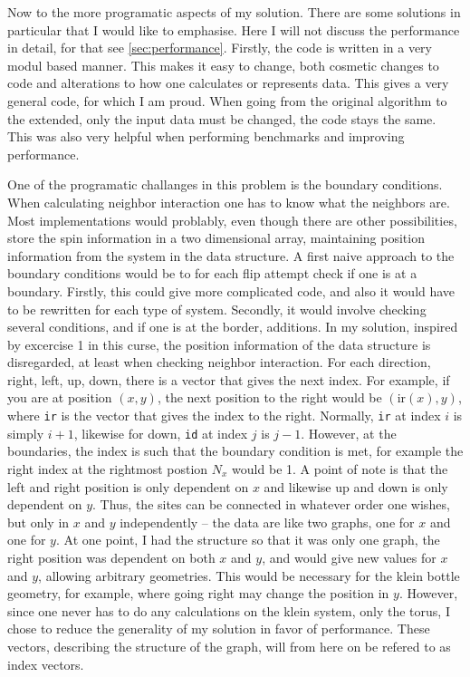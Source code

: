 \documentclass[12pt, a4paper]{article}
\begin{document}
Now to the more programatic aspects of my solution.
There are some solutions in particular that I would like to emphasise.
Here I will not discuss the performance in detail, for that see \ref{sec:performance}.
Firstly, the code is written in a very modul based manner.
This makes it easy to change, both cosmetic changes to code and alterations to how one calculates or represents data.
This gives a very general code, for which I am proud.
When going from the original algorithm to the extended, only the input data must be changed, the code stays the same.
This was also very helpful when performing benchmarks and improving performance.

One of the programatic challanges in this problem is the boundary conditions.
When calculating neighbor interaction one has to know what the neighbors are.
Most implementations would problably, even though there are other possibilities, store the spin information in a two dimensional array, maintaining position information from the system in the data structure.
A first naive approach to the boundary conditions would be to for each flip attempt check if one is at a boundary.
Firstly, this could give more complicated code, and also it would have to be rewritten for each type of system.
Secondly, it would involve checking several conditions, and if one is at the border, additions.
In my solution, inspired by excercise 1 in this curse, the position information of the data structure is disregarded, at least when checking neighbor interaction.
For each direction, right, left, up, down, there is a vector that gives the next index.
For example, if you are at position $(x, y)$, the next position to the right would be $(\text{ir}(x), y)$, where \verb|ir| is the vector that gives the index to the right.
Normally, \verb|ir| at index $i$ is simply $i+1$, likewise for down, \verb|id| at index $j$ is $j-1$.
However, at the boundaries, the index is such that the boundary condition is met, for example the right index at the rightmost postion $N_x$ would be 1.
A point of note is that the left and right position is only dependent on $x$ and likewise up and down is only dependent on $y$.
Thus, the sites can be connected in whatever order one wishes, but only in $x$ and $y$ independently -- the data are like two graphs, one for $x$ and one for $y$.
At one point, I had the structure so that it was only one graph, the right position was dependent on both $x$ and $y$, and would give new values for $x$ and $y$, allowing arbitrary geometries.
This would be necessary for the klein bottle geometry, for example, where going right may change the position in $y$.
However, since one never has to do any calculations on the klein system, only the torus, I chose to reduce the generality of my solution in favor of performance.
These vectors, describing the structure of the graph, will from here on be refered to as index vectors.
\end{document}
